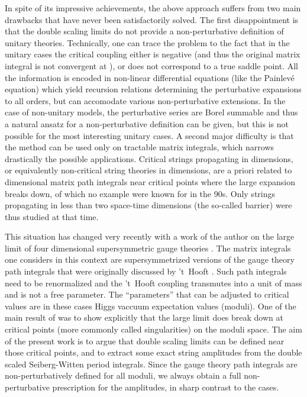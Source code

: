 \documentclass[a4paper,12pt]{article}
\begin{document}
In spite of its impressive achievements, the above approach suffers from
two main drawbacks that have never been satisfactorily solved. The first
disappointment is that the double
scaling limits do not provide a non-perturbative definition of unitary
theories. Technically, one can trace the problem to the fact that in 
the unitary cases the
critical coupling \coordHE{} either is negative (and thus the original
matrix integral is not convergent at \coordHE{}), or does not
correspond to a true saddle point. All the information is encoded in
non-linear differential equations (like the Painlev\'e equation)
which yield recursion relations determining 
the perturbative expansions to all orders, but can
accomodate various non-perturbative extensions. In the case of
non-unitary models, the perturbative series are Borel summable and thus
a natural ansatz for a non-perturbative definition can be given, but
this is not possible for the most interesting unitary cases.
A second major difficulty is that the method can be used only on
tractable matrix integrals, which narrows drastically
the possible applications. Critical strings propagating 
in \coordHE{} dimensions, or equivalently non-critical string 
theories in \coordHE{} dimensions,
are a priori related to \coordHE{} dimensional matrix path integrals near
critical points where the large \coordHE{} expansion breaks down, of which no
example were known for \coordHE{} in the 90s. Only strings propagating in 
less than two space-time dimensions (the so-called \coordHE{} barrier) were
thus studied at that time. 

This situation has changed very recently with a work of the author on the
large \coordHE{} limit of four dimensional
\coordHE{} supersymmetric gauge theories \cite{fer}.
The matrix integrals one considers in this context are 
supersymmetrized versions of the gauge
theory path integrals that were originally discussed by 't~Hooft
\cite{tHooft}. Such path integrals need to be renormalized and the
't~Hooft coupling \coordHE{} transmutes into a unit of mass and is not a free
parameter. The ``parameters''
that can be adjusted to critical values are in
these cases Higgs vaccuum expectation values (moduli).
One of the main result of \cite{fer} was to
show explicitly that the large \coordHE{} limit does break
down at critical points (more commonly called singularities) on the
moduli space. The aim of the present work is to argue that double scaling
limits can be defined near those critical points, and to extract some
exact string
amplitudes from the double scaled Seiberg-Witten period integrals.
Since the gauge theory path integrals are non-perturbatively 
defined for all moduli, we always obtain a full 
non-perturbative prescription for the amplitudes, in sharp contrast to
the \coordHE{} cases.
\end{document}

